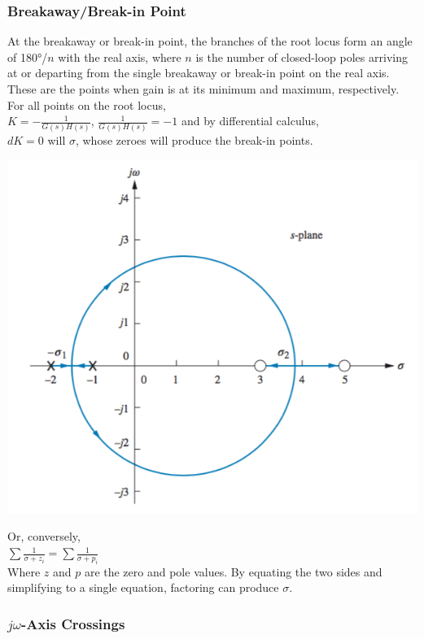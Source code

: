 \documentclass[11pt]{article}
\begin{document}
    \subsubsection{Breakaway/Break-in Point}

    At the breakaway or break-in point, the branches of the root locus form an angle of 180°/$n$ with the real axis, where $n$ is the number of closed-loop poles arriving at or departing from the single breakaway or break-in point on the real axis. These are the points when gain is at its minimum and maximum, respectively. \\
        
    For all points on the root locus, \\
    
    $K = -\frac{1}{G(s)H(s)}$, $\frac{1}{G(s)H(s)} = -1$ and by differential calculus, \\
    
    $dK = 0$ will $\sigma$, whose zeroes will produce the break-in points.

    \begin{center}
        \includegraphics[width=300 px]{img/breakpoints} \\
    \end{center}

    Or, conversely, \\

    $\sum \frac{1}{\sigma + z_i} = \sum \frac{1}{\sigma + p_i}$ \\

    Where $z$ and $p$ are the zero and pole values. By equating the two sides and simplifying to a single equation, factoring can produce $\sigma$.

    \subsubsection{$j\omega$-Axis Crossings}
\end{document}
